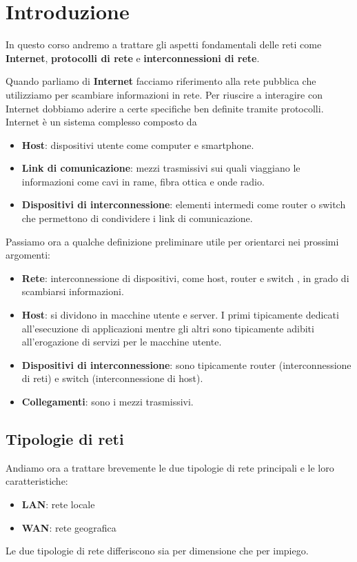 \chapter{Introduzione}
In questo corso andremo a trattare gli aspetti fondamentali delle reti 
come \textbf{Internet}, \textbf{protocolli di rete} e
\textbf{interconnessioni di rete}.

Quando parliamo di \textbf{Internet} facciamo riferimento alla rete 
pubblica che utilizziamo per scambiare informazioni in rete. Per
riuscire a interagire con Internet dobbiamo aderire a certe specifiche 
ben definite tramite protocolli. Internet è un sistema complesso
composto da
\begin{itemize}
	\item \textbf{Host}: dispositivi utente come computer e smartphone.
	\item \textbf{Link di comunicazione}: mezzi trasmissivi sui quali
		viaggiano le informazioni come cavi in rame, fibra ottica e
		onde radio.
	\item \textbf{Dispositivi di interconnessione}: elementi intermedi
		come router o switch che permettono di condividere i link di
		comunicazione.
\end{itemize}
Passiamo ora a qualche definizione preliminare utile per orientarci
nei prossimi argomenti:
\begin{itemize}
	\item \textbf{Rete}: interconnessione di dispositivi, come host, 
		router e switch , in grado di scambiarsi informazioni.
	\item \textbf{Host}: si dividono in macchine utente e server. I
		primi tipicamente dedicati all'esecuzione di applicazioni
		mentre gli altri sono tipicamente adibiti all'erogazione di
		servizi per le macchine utente.
	\item \textbf{Dispositivi di interconnessione}: sono tipicamente 
		router (interconnessione di reti) e switch (interconnessione 
		di host).
	\item \textbf{Collegamenti}: sono i mezzi trasmissivi.
\end{itemize}

\section{Tipologie di reti}
Andiamo ora a trattare brevemente le due tipologie di rete principali 
e le loro caratteristiche:
\begin{itemize}
	\item \textbf{LAN}: rete locale
	\item \textbf{WAN}: rete geografica
\end{itemize}
Le due tipologie di rete differiscono sia per dimensione che per 
impiego.

